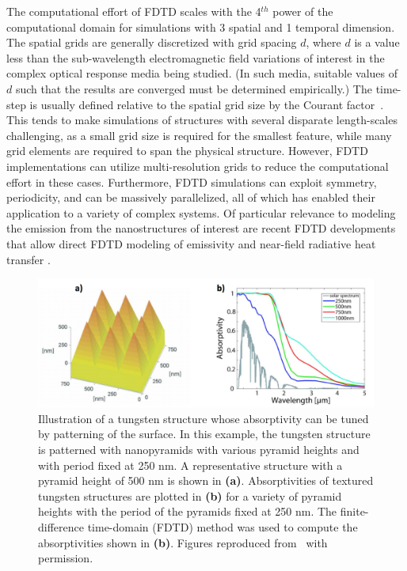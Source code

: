 \documentclass[10pt,letterpaper]{article}
\begin{document}
The computational effort of FDTD scales with the 4$^{th}$ power of the computational domain for 
simulations with 3 spatial and 1 temporal dimension.
The spatial grids are generally discretized with grid spacing $d$, where $d$ is a value less
than the sub-wavelength electromagnetic field variations of interest in the complex
optical response media being studied. (In such media, suitable values of $d$ 
such that the results are converged must
be determined empirically.)
The time-step is usually defined relative to the spatial grid size by the Courant 
factor~\cite{Taflove_FDTD}.   This tends to make simulations of structures with several disparate length-scales challenging, as a small
grid size is required for the smallest feature, while many grid elements are required to span the physical structure.  However, FDTD 
implementations can utilize multi-resolution grids to reduce the computational effort in these cases.  Furthermore, FDTD simulations 
can exploit symmetry, periodicity, and can be massively parallelized, all of which has enabled their application to a variety of complex systems.
Of particular relevance to modeling the emission from the nanostructures of interest are recent
FDTD developments that allow direct FDTD modeling of emissivity and near-field radiative heat transfer
\cite{rodriguez2011,datas2013,didari2014,didari2015}.


\begin{figure}[ht]
        \includegraphics[width=\textwidth]{FDTD_Modeling}
        \caption{\label{FDTD_Structures}  Illustration of a tungsten structure whose
absorptivity can be tuned by patterning of the surface.  In this example, the tungsten
structure is patterned with nanopyramids with various pyramid heights and with period fixed
at  250 nm.  A representative structure with a pyramid height of 500 nm is shown in {\bf (a)}.
Absorptivities of textured tungsten structures
are plotted in {\bf (b)} for a variety of pyramid heights with the period of the pyramids
fixed at 250 nm.  The finite-difference time-domain (FDTD) method
was used to compute the absorptivities shown in {\bf (b)}.  
Figures reproduced from~\cite{RF_OptExp_2009} with permission.}
\end{figure}
\end{document}
